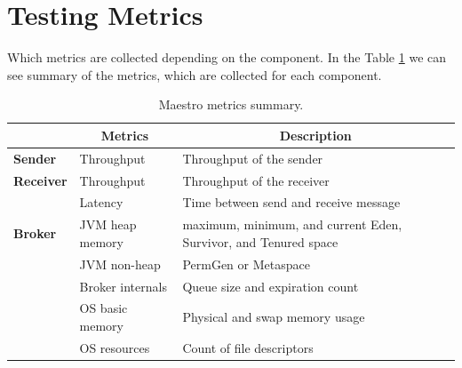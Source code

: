 


\section*{Testing Metrics}
\label{Testing Metrics}
Which metrics are collected depending on the component. In the Table \ref{tab:maestro_metrics} we can see summary of the metrics, which are collected for each component.

\begin{table}[H]
\centering
\begin{tabular}{|p{2.5cm}|p{3.5cm}|p{7cm}|}
\hline
\rowcolor[HTML]{C5E3DF} 
\multicolumn{1}{|c|}{\textbf{Component}} & \multicolumn{1}{c|}{\textbf{Metrics}} & \multicolumn{1}{c|}{\textbf{Description}}                       \\ \hline
\textbf{Sender}                          & Throughput                            & Throughput of the sender                                        \\ \hline
\textbf{Receiver}                        & Throughput                            & Throughput of the receiver                                      \\ \hline
\textbf{}                                & Latency                               & Time between send and receive message                           \\ \hline
\textbf{Broker}			                & JVM heap memory                       & maximum, minimum, and current Eden, Survivor, and Tenured space \\ \hline
                                         & JVM non-heap                          & PermGen or Metaspace                                            \\ \hline
                                         & Broker internals                      & Queue size and expiration count                                 \\ \hline
                                         & OS basic memory                       & Physical and swap memory usage                                  \\ \hline
                                         & OS resources                          & Count of file descriptors                                       \\ \hline
\end{tabular}
\caption{Maestro metrics summary.}
\label{tab:maestro_metrics}
\end{table}

